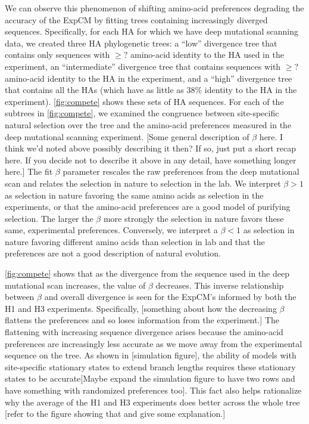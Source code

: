 \documentclass[11pt]{article}
\newcommand\jdbcomment[1]{{\color{red}[#1]}}
\begin{document}
We can observe this phenomenon of shifting amino-acid preferences degrading the accuracy of the ExpCM by fitting trees containing increasingly diverged sequences.
Specifically, for each HA for which we have deep mutational scanning data, we created three HA phylogenetic trees: a ``low'' divergence tree that contains only sequences with $\ge ?$ amino-acid identity to the HA used in the experiment, an ``intermediate'' divergence tree that contains sequences with $\ge ?$ amino-acid identity to the HA in the experiment, and a ``high'' divergence tree that contains all the HAs (which have as little as 38\% identity to the HA in the experiment).
\ref{fig:compete} shows these sets of HA sequences.
For each of the subtrees in \ref{fig:compete}, we examined the congruence between site-specific natural selection over the tree and the amino-acid preferences measured in the deep mutational scanning experiment. 
\jdbcomment{Some general description of $\beta$ here. I think we'd noted above possibly describing it then? If so, just put a short recap here. If you decide not to describe it above in any detail, have something longer here.}
The fit $\beta$ parameter rescales the raw preferences from the deep mutational scan and relates the selection in nature to selection in the lab. 
We interpret $\beta >1$ as selection in nature favoring the same amino acids as selection in the experiments, or that the amino-acid preferences are a good model of purifying selection. 
The larger the $\beta$ more strongly the selection in nature favors these same, experimental preferences. 
Conversely, we interpret a $\beta<1$ as selection in nature favoring different amino acids than selection in lab and that the preferences are not a good description of natural evolution.  

\ref{fig:compete} shows that as the divergence from the sequence used in the deep mutational scan increases, the value of $\beta$ decreases. 
This inverse relationship between $\beta$ and overall divergence is seen for the ExpCM's informed by both the H1 and H3 experiments.
Specifically, \jdbcomment{something about how the decreasing $\beta$ flattens the preferences and so loses information from the experiment.}
The flattening with increasing sequence divergence arises because the amino-acid preferences are increasingly less accurate as we move away from the experimental sequence on the tree.
As shown in \jdbcomment{simulation figure}, the ability of models with site-specific stationary states to extend branch lengths requires these stationary states to be accurate\jdbcomment{Maybe expand the simulation figure to have two rows and have something with randomized preferences too}.
This fact also helps rationalize why the average of the H1 and H3 experiments does better across the whole tree \jdbcomment{refer to the figure showing that and give some explanation.}
 
\end{document}
